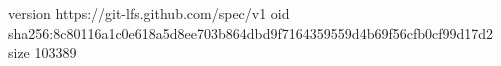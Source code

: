 version https://git-lfs.github.com/spec/v1
oid sha256:8c80116a1c0e618a5d8ee703b864dbd9f7164359559d4b69f56cfb0cf99d17d2
size 103389
